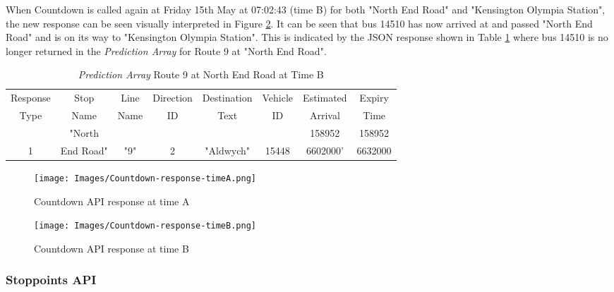 When Countdown is called again at Friday 15th May at 07:02:43 (time B) for both "North End Road" and "Kensington Olympia Station", the new response can be seen visually interpreted in Figure \ref{fig:countdown-response-timeB}. It can be seen that bus 14510 has now arrived at and passed "North End Road" and is on its way to "Kensington Olympia Station". This is indicated by the JSON response shown in Table \ref{table:prediction-array-stopa-updated} where bus 14510 is no longer returned in the \textit{Prediction Array} for Route 9 at "North End Road".

\begin{table}[H]
    \centering
    \setlength\tabcolsep{2pt}
    \begin{tabular}{|c|c|c|c|c|c|c|c|}
        \hline
          Response & Stop   &   Line & Direction & Destination & Vehicle & Estimated & Expiry \\[-3pt]
           Type & Name &    Name & ID &  Text & ID & Arrival &  Time \\
        \hline
             & "North &  &  &  &  & 158952 & 158952 \\[-3pt]
            1 & End Road" & "9" & 2 & "Aldwych" & 15448 & 6602000' & 6632000 \\
        \hline
        \end{tabular}
    \caption{\textit{Prediction Array} Route 9 at North End Road at Time B}
    \label{table:prediction-array-stopa-updated}
\end{table}

\begin{figure}[H]
\begin{center}
    \texttt{[image: Images/Countdown-response-timeA.png]}
    \caption{Countdown API response at time A}
    \label{fig:countdown-response-timeA}
\end{center}
\end{figure}

\begin{figure}[H]
\begin{center}
    \texttt{[image: Images/Countdown-response-timeB.png]}
    \caption{Countdown API response at time B}
    \label{fig:countdown-response-timeB}
\end{center}
\end{figure}

\subsubsection{Stoppoints API}

